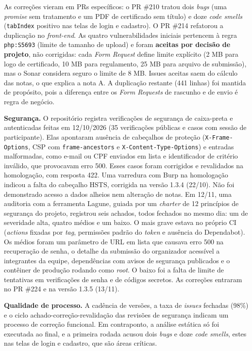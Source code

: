 As correções vieram em PRs específicos: o PR \#210 tratou dois \textit{bugs} (uma \textit{promise} sem tratamento e um PDF de certificado sem título) e doze \textit{code smells} (\texttt{tabIndex} positivo nas telas de login e cadastro). O PR \#214 refatorou a duplicação no \textit{front-end}. As quatro vulnerabilidades iniciais pertencem à regra \texttt{php:S5693} (limite de tamanho de upload) e foram \textbf{aceitas por decisão de projeto}, não corrigidas: cada \textit{Form Request} define limite explícito (2 MB para logo de certificado, 10 MB para regulamento, 25 MB para arquivo de submissão), mas o Sonar considera seguro o limite de 8 MB. Issues aceitas saem do cálculo das notas, o que explica a nota A. A duplicação restante (441 linhas) foi mantida de propósito, pois a diferença entre os \textit{Form Requests} de rascunho e de envio é regra de negócio.

\textbf{Segurança.} O repositório registra verificações de segurança de caixa-preta e autenticadas feitas em 12/10/2026 (35 verificações públicas e casos com sessão de participante). Elas apontaram ausência de cabeçalhos de proteção (\texttt{X-Frame-Options}, CSP com \texttt{frame-ancestors} e \texttt{X-Content-Type-Options}) e entradas malformadas, como e-mail ou CPF enviados em lista e identificador de critério inválido, que provocavam erro 500. Esses casos foram corrigidos e revalidados na homologação, com resposta 422. Uma varredura com Burp na homologação indicou a falta do cabeçalho HSTS, corrigida na versão 1.3.4 (22/10). Não foi demonstrado acesso a dados alheios nem alteração de notas. Em 12/11, uma auditoria com a ferramenta Lagune, guiada por um \textit{charter} de 12 princípios de segurança do projeto, registrou seis achados, todos fechados no mesmo dia: um de severidade alta, quatro médios e um baixo. O mais grave estava no próprio CI (\textit{actions} fixadas por \textit{tag}, permissões padrão do \textit{token} e ausência do Dependabot). Os médios foram um parâmetro de URL em lista que causava erro 500 na recuperação de senha, o detalhe da submissão do organizador acessível a integrantes da equipe, dependências com avisos de segurança publicados e o contêiner de produção rodando como \textit{root}. O baixo foi a falta de limite de tentativas em verificações de senha e de códigos secretos. As correções entraram no PR \#224 e na versão 1.3.5 (13/11).

\textbf{Qualidade de processo.} A cadência de versões, a taxa de \textit{issues} fechadas (98\%) e o ciclo achado-correção-revalidação das revisões de segurança indicam um processo de correção funcional. Em contraponto, a análise estática só foi executada ao final, e a primeira rodada acusou dois \textit{bugs} e doze \textit{code smells}, estes nas telas de login e cadastro, que são áreas críticas.


